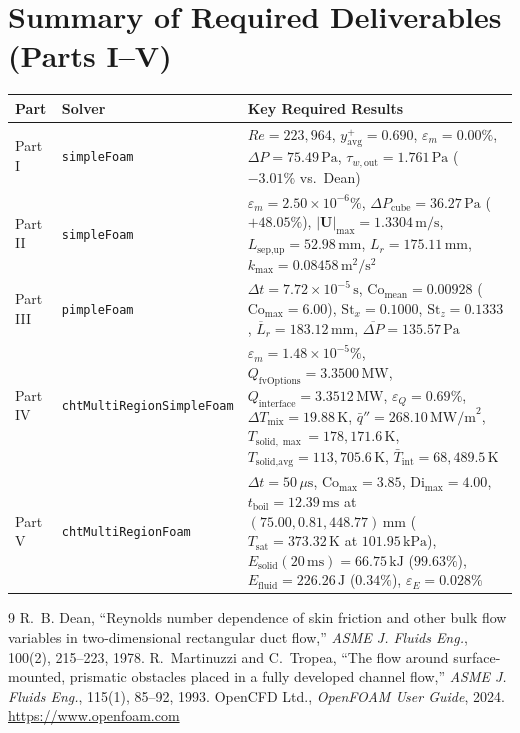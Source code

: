 \documentclass[10pt,a4paper]{article}
\begin{document}
\section*{Summary of Required Deliverables (Parts I--V)}
\begin{table}[htbp]
    \centering
    \footnotesize
    \begin{tabularx}{\textwidth}{@{}l l X@{}}
        \toprule
        \textbf{Part} & \textbf{Solver} & \textbf{Key Required Results} \\
        \midrule
        Part I & \texttt{simpleFoam} & $Re = 223{,}964$, $y^+_{\text{avg}} = 0.690$, $\varepsilon_m = 0.00\%$, $\Delta P = 75.49\,\text{Pa}$, $\tau_{w,\text{out}} = 1.761\,\text{Pa}$ ($-3.01\%$ vs.\ Dean) \\
        Part II & \texttt{simpleFoam} & $\varepsilon_m = 2.50\times 10^{-6}\%$, $\Delta P_{\text{cube}} = 36.27\,\text{Pa}$ ($+48.05\%$), $|\mathbf{U}|_{\max} = 1.3304\,\text{m/s}$, $L_{\text{sep,up}} = 52.98\,\text{mm}$, $L_r = 175.11\,\text{mm}$, $k_{\max} = 0.08458\,\text{m}^2/\text{s}^2$ \\
        Part III & \texttt{pimpleFoam} & $\Delta t = 7.72\times 10^{-5}\,\text{s}$, $\mathrm{Co}_{\text{mean}} = 0.00928$ ($\mathrm{Co}_{\max} = 6.00$), $\mathrm{St}_x = 0.1000$, $\mathrm{St}_z = 0.1333$, $\overline{L}_r = 183.12\,\text{mm}$, $\overline{\Delta P} = 135.57\,\text{Pa}$ \\
        Part IV & \texttt{chtMultiRegionSimpleFoam} & $\varepsilon_m = 1.48\times 10^{-5}\%$, $Q_{\text{fvOptions}} = 3.3500\,\text{MW}$, $Q_{\text{interface}} = 3.3512\,\text{MW}$, $\varepsilon_Q = 0.69\%$, $\Delta T_{\text{mix}} = 19.88\,\text{K}$, $\bar{q}'' = 268.10\,\text{MW/m}^2$, $T_{\text{solid},\max} = 178{,}171.6\,\text{K}$, $T_{\text{solid,avg}} = 113{,}705.6\,\text{K}$, $\bar{T}_{\text{int}} = 68{,}489.5\,\text{K}$ \\
        Part V & \texttt{chtMultiRegionFoam} & $\Delta t = 50\,\mu\text{s}$, $\mathrm{Co}_{\max} = 3.85$, $\mathrm{Di}_{\max} = 4.00$, $t_{\text{boil}} = 12.39\,\text{ms}$ at $(75.00, 0.81, 448.77)\,\text{mm}$ ($T_{\text{sat}} = 373.32\,\text{K}$ at $101.95\,\text{kPa}$), $E_{\text{solid}}(20\,\text{ms}) = 66.75\,\text{kJ}$ ($99.63\%$), $E_{\text{fluid}} = 226.26\,\text{J}$ ($0.34\%$), $\varepsilon_E = 0.028\%$ \\
        \bottomrule
    \end{tabularx}
\end{table}

\begin{thebibliography}{9}\small\setlength{\itemsep}{2pt}
 R.~B. Dean, ``Reynolds number dependence of skin friction and other bulk flow variables in two-dimensional rectangular duct flow,'' \emph{ASME J. Fluids Eng.}, 100(2), 215--223, 1978.
 R.~Martinuzzi and C.~Tropea, ``The flow around surface-mounted, prismatic obstacles placed in a fully developed channel flow,'' \emph{ASME J. Fluids Eng.}, 115(1), 85--92, 1993.
 OpenCFD Ltd., \emph{OpenFOAM User Guide}, 2024. \url{https://www.openfoam.com}
\end{thebibliography}
\end{document}
